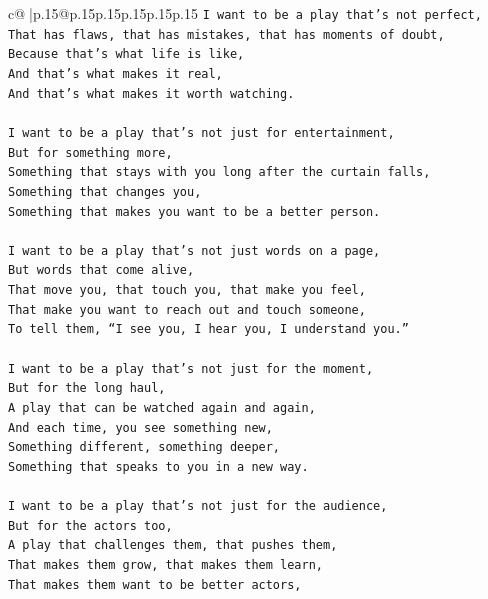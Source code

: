 \documentclass{article}
\begin{document}
{\begin{supertabular}{c@{$\;$}|p{.15\linewidth}@{}p{.15\linewidth}p{.15\linewidth}p{.15\linewidth}p{.15\linewidth}p{.15\linewidth}}
{{{\texttt{I want to be a play that’s not perfect,} \\
\texttt{That has flaws, that has mistakes, that has moments of doubt,} \\
\texttt{Because that’s what life is like,} \\
\texttt{And that’s what makes it real,} \\
\texttt{And that’s what makes it worth watching.} \\
\\ 
\texttt{I want to be a play that’s not just for entertainment,} \\
\texttt{But for something more,} \\
\texttt{Something that stays with you long after the curtain falls,} \\
\texttt{Something that changes you,} \\
\texttt{Something that makes you want to be a better person.} \\
\\ 
\texttt{I want to be a play that’s not just words on a page,} \\
\texttt{But words that come alive,} \\
\texttt{That move you, that touch you, that make you feel,} \\
\texttt{That make you want to reach out and touch someone,} \\
\texttt{To tell them, “I see you, I hear you, I understand you.”} \\
\\ 
\texttt{I want to be a play that’s not just for the moment,} \\
\texttt{But for the long haul,} \\
\texttt{A play that can be watched again and again,} \\
\texttt{And each time, you see something new,} \\
\texttt{Something different, something deeper,} \\
\texttt{Something that speaks to you in a new way.} \\
\\ 
\texttt{I want to be a play that’s not just for the audience,} \\
\texttt{But for the actors too,} \\
\texttt{A play that challenges them, that pushes them,} \\
\texttt{That makes them grow, that makes them learn,} \\
\texttt{That makes them want to be better actors,} \\
}}}
\end{supertabular}}
\end{document}
